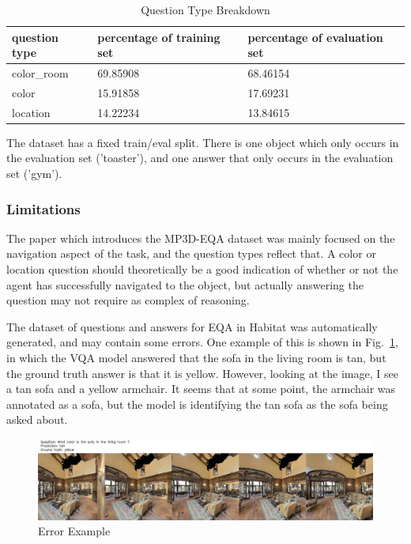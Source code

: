 \begin{table}[h]
\centering
\caption{Question Type Breakdown}
\begin{tabular}{ |l|l|l| }
\hline
\textbf{question type} & \textbf{percentage of training set} & \textbf{percentage of evaluation set} \\
\hline
color\_room & 69.85908 & 68.46154\\
color & 15.91858 & 17.69231\\
location & 14.22234 & 13.84615\\
\hline
\end{tabular}
\label{tab:q_breakdown}
\end{table}

The dataset has a fixed train/eval split. There is one object which only occurs in the evaluation set ('toaster'), and one answer that only occurs in the evaluation set ('gym'). 

\subsubsection{Limitations}
The paper which introduces the MP3D-EQA dataset was mainly focused on the navigation aspect of the task, and the question types reflect that. A color or location question should theoretically be a good indication of whether or not the agent has successfully navigated to the object, but actually answering the question may not require as complex of reasoning. 

The dataset of questions and answers for EQA in Habitat was automatically generated, and may contain some errors. One example of this is shown in Fig.~\ref{fig:err_ex}, in which the VQA model answered that the sofa in the living room is tan, but the ground truth answer is that it is yellow. However, looking at the image, I see a tan sofa and a yellow armchair. It seems that at some point, the armchair was annotated as a sofa, but the model is identifying the tan sofa as the sofa being asked about. 

\begin{figure}[h]
	\centering
	\includegraphics[width=\textwidth]{./figure/error_images/ckpt_0_121_image.jpg}
	\caption{Error Example}
	\label{fig:err_ex}
\end{figure}




